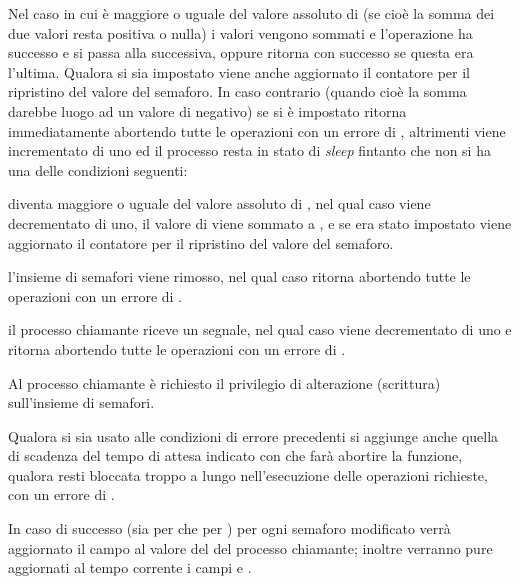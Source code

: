 \begin{basedescript}{\desclabelwidth{1.8cm}}
\item[\var{sem\_op} $<0$] Nel caso in cui  è maggiore o uguale del
  valore assoluto di  (se cioè la somma dei due valori resta
  positiva o nulla) i valori vengono sommati e l'operazione ha successo e si
  passa alla successiva, oppure  ritorna con successo se questa
  era l'ultima. Qualora si sia impostato  viene anche
  aggiornato il contatore per il ripristino del valore del semaforo. In caso
  contrario (quando cioè la somma darebbe luogo ad un valore di 
  negativo) se si è impostato   ritorna
  immediatamente abortendo tutte le operazioni con un errore di
  , altrimenti viene incrementato di uno  ed il
  processo resta in stato di \textit{sleep} fintanto che non si ha una delle
  condizioni seguenti:
  \begin{itemize*}
  \item {} diventa maggiore o uguale del valore assoluto di
    , nel qual caso  viene decrementato di uno, il
    valore di  viene sommato a , e se era stato
    impostato  viene aggiornato il contatore per il
    ripristino del valore del semaforo.
  \item l'insieme di semafori viene rimosso, nel qual caso 
    ritorna abortendo tutte le operazioni con un errore di .
  \item il processo chiamante riceve un segnale, nel qual caso 
    viene decrementato di uno e  ritorna abortendo tutte le
    operazioni con un errore di .
  \end{itemize*}    
  Al processo chiamante è richiesto il privilegio di alterazione (scrittura)
  sull'insieme di semafori.
\end{basedescript}

Qualora si sia usato  alle condizioni di errore precedenti si
aggiunge anche quella di scadenza del tempo di attesa indicato
con  che farà abortire la funzione, qualora resti bloccata
troppo a lungo nell'esecuzione delle operazioni richieste, con un errore di
.

In caso di successo (sia per  che per ) per ogni
semaforo modificato verrà aggiornato il campo  al valore del
 del processo chiamante; inoltre verranno pure aggiornati al tempo
corrente i campi  e .

